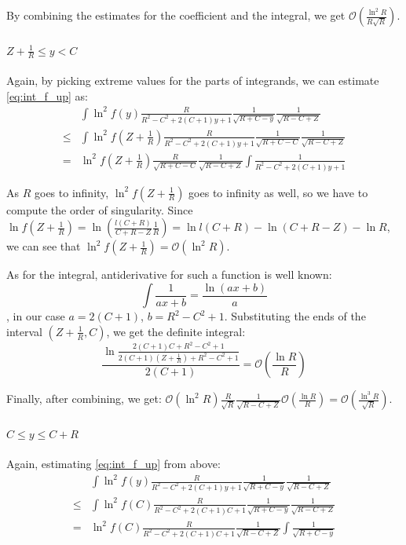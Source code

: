 \documentclass{gCOV2e}
\theoremstyle{plain}%
\theoremstyle{definition}
\theoremstyle{remark}
\newcommand{\mcO}{\mathcal{O}} %
\begin{document}
By combining the estimates for the coefficient and the integral, we get $\mcO(\frac{\ln^2 R}{R \sqrt{R}})$.

\paragraph{$Z + \frac{1}{R} \le y < C$}
Again, by picking extreme values for the parts of integrands, we can estimate \ref{eq:int_f_up} as:
\begin{align*}
       & \int \ln^2 f(y) \frac{R}{R^2 - C^2 + 2 (C + 1) y + 1} \frac{1}{\sqrt{R + C - y}} \frac{1}{\sqrt{R - C + Z}}
\\ \le & \int \ln^2 f(Z + \frac{1}{R}) \frac{R}{R^2 - C^2 + 2 (C + 1) y + 1} \frac{1}{\sqrt{R + C - C}} \frac{1}{\sqrt{R - C + Z}}
\\  =  & \ln^2 f(Z + \frac{1}{R})  \frac{R}{\sqrt{R + C - C}} \frac{1}{\sqrt{R - C + Z}} \int \frac{1}{R^2 - C^2 + 2 (C + 1) y + 1}
\end{align*}

As $R$ goes to infinity, $\ln^2 f(Z + \frac{1}{R})$ goes to infinity as well, so we have to compute the order of singularity. Since $\ln f(Z + \frac{1}{R}) = \ln \left( \frac{l(C + R)}{C + R - Z} \frac{1}{R} \right) = \ln l(C + R) - \ln (C + R - Z) - \ln R$, we can see that $\ln^2 f(Z + \frac{1}{R}) = \mcO (\ln^2 R)$.


As for the integral, antiderivative for such a function is well known:
\[
\int \frac{1}{a x + b} = \frac{\ln (a x + b)}{a}
\]
, in our case $a = 2 (C + 1)$, $b = R^2 - C^2 + 1$. Substituting the ends of the interval $(Z + \frac{1}{R}, C)$, we get the definite integral:
\[
\frac{\ln \frac{2 (C + 1) C + R^2 - C^2 + 1}{2 (C + 1) (Z + \frac{1}{R}) + R^2 - C^2 + 1}}{2 (C + 1)} = \mcO\left( \frac{\ln R}{R} \right)
\]


Finally, after combining, we get: $\mcO (\ln^2 R) \frac{R}{\sqrt{R}} \frac{1}{\sqrt{R - C + Z}} \mcO\left( \frac{\ln R}{R} \right)  = \mcO\left( \frac{\ln^3 R}{\sqrt{R}} \right)$.

\paragraph{$C \le y \le C + R$}

Again, estimating \ref{eq:int_f_up} from above:
\begin{align*}
       & \int \ln^2 f(y) \frac{R}{R^2 - C^2 + 2 (C + 1) y + 1} \frac{1}{\sqrt{R + C - y}} \frac{1}{\sqrt{R - C + Z}}
\\ \le & \int \ln^2 f(C) \frac{R}{R^2 - C^2 + 2 (C + 1) C + 1} \frac{1}{\sqrt{R + C - y}} \frac{1}{\sqrt{R - C + Z}}
\\ =   & \ln^2 f(C) \frac{R}{R^2 - C^2 + 2 (C + 1) C + 1} \frac{1}{\sqrt{R - C + Z}} \int \frac{1}{\sqrt{R + C - y}}
\end{align*}
\end{document}
